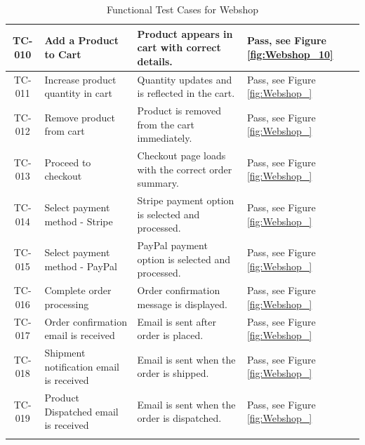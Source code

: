 \documentclass{llncs}
\begin{document}
\begin{longtable}{|c|>{\raggedright}p{4.8cm}|p{6cm}|>{\centering\arraybackslash}p{2cm}|}
    TC-010                & Add a Product to Cart                      & Product appears in cart with correct details.             & Pass, see Figure \ref{fig:Webshop_10}         \\ \hline
    TC-011                & Increase product quantity in cart          & Quantity updates and is reflected in the cart.            & Pass, see Figure \ref{fig:Webshop_}           \\ \hline
    TC-012                & Remove product from cart                   & Product is removed from the cart immediately.             & Pass, see Figure \ref{fig:Webshop_}           \\ \hline
    TC-013                & Proceed to checkout                        & Checkout page loads with the correct order summary.       & Pass, see Figure \ref{fig:Webshop_}           \\ \hline
    TC-014                & Select payment method - Stripe             & Stripe payment option is selected and processed.          & Pass, see Figure \ref{fig:Webshop_}           \\ \hline
    TC-015                & Select payment method - PayPal             & PayPal payment option is selected and processed.          & Pass, see Figure \ref{fig:Webshop_}           \\ \hline
    TC-016                & Complete order processing                  & Order confirmation message is displayed.                  & Pass, see Figure \ref{fig:Webshop_}           \\ \hline
    TC-017                & Order confirmation email is received       & Email is sent after order is placed.                      & Pass, see Figure \ref{fig:Webshop_}           \\ \hline
    TC-018                & Shipment notification email is received    & Email is sent when the order is shipped.                  & Pass, see Figure \ref{fig:Webshop_}           \\ \hline
    TC-019                & Product Dispatched email is received       & Email is sent when the order is dispatched.               & Pass, see Figure \ref{fig:Webshop_}           \\ \hline
    \caption{Functional Test Cases for Webshop} \label{tab:functional-test-cases}
\end{longtable}
\end{document}
